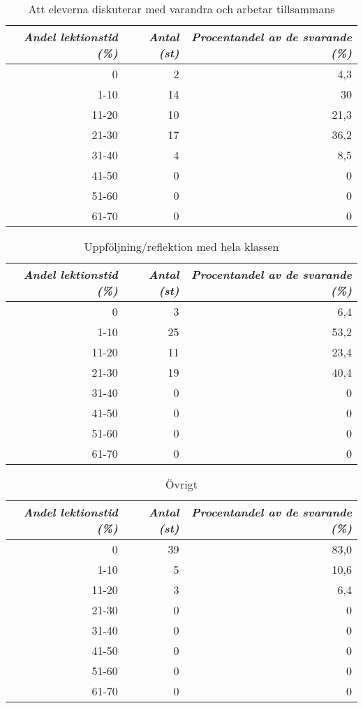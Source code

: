 \begin{table}
\caption{Att eleverna diskuterar med varandra och arbetar tillsammans}
\centering
\begin{tabular}{||r|r|r||} \hline\hline
\emph{Andel lektionstid (\%)} & \emph{Antal (st)} & \emph{Procentandel av de svarande (\%)} \\ \hline
\hline
0 & 2 & 4,3 \\ \hline
1-10 & 14 & 30 \\ \hline
11-20 & 10 & 21,3 \\ \hline
21-30 & 17 & 36,2 \\ \hline
31-40 & 4 & 8,5 \\ \hline
41-50 & 0 & 0 \\ \hline
51-60 & 0 & 0 \\ \hline
61-70 & 0 & 0 \\ \hline\hline
\end{tabular}
\label{table:Diskussion}
\end{table}

\begin{table}
\caption{Uppföljning/reflektion med hela klassen}
\centering
\begin{tabular}{||r|r|r||} \hline\hline
\emph{Andel lektionstid (\%)} & \emph{Antal (st)} & \emph{Procentandel av de svarande (\%)} \\ \hline
\hline
0 & 3 & 6,4 \\ \hline
1-10 & 25 & 53,2 \\ \hline
11-20 & 11 & 23,4 \\ \hline
21-30 & 19 & 40,4 \\ \hline
31-40 & 0 & 0 \\ \hline
41-50 & 0 & 0 \\ \hline
51-60 & 0 & 0 \\ \hline
61-70 & 0 & 0 \\ \hline\hline
\end{tabular}
\label{table:Uppfoljning}
\end{table}

\begin{table}
\caption{Övrigt}
\centering
\begin{tabular}{||r|r|r||} \hline\hline
\emph{Andel lektionstid (\%)} & \emph{Antal (st)} & \emph{Procentandel av de svarande (\%)} \\ \hline
\hline
0 & 39 & 83,0 \\ \hline
1-10 & 5 & 10,6 \\ \hline
11-20 & 3 & 6,4 \\ \hline
21-30 & 0 & 0 \\ \hline
31-40 & 0 & 0 \\ \hline
41-50 & 0 & 0 \\ \hline
51-60 & 0 & 0 \\ \hline
61-70 & 0 & 0 \\ \hline\hline
\end{tabular}
\label{table:Ovrigt}
\end{table}

